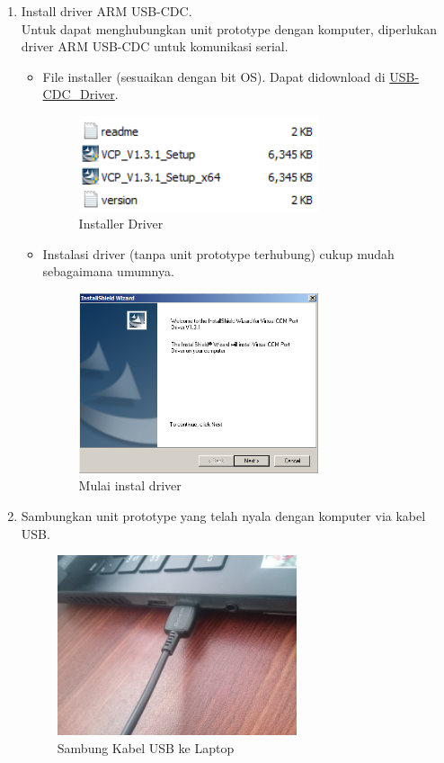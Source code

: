 \documentclass{article}
\begin{document}
	\begin{enumerate}
		\item Install driver ARM USB-CDC.\\
		Untuk dapat menghubungkan unit prototype dengan komputer,
		diperlukan driver ARM USB-CDC untuk komunikasi serial.
		
		\begin{itemize}
			\item File installer (sesuaikan dengan bit OS).
			Dapat didownload di \href{https://drive.google.com/drive/folders/19gXVrxR68SFHQUGGGgKb0Da03oV7Rh41?usp=share_link}{USB-CDC\_Driver}.
			\begin{figure}[!ht]
				\centering
				\includegraphics[width=200pt]{images/software/driver}
				\caption{Installer Driver}
			\end{figure}
			
			\newpage
			\item Instalasi driver (tanpa unit prototype terhubung) cukup mudah sebagaimana umumnya.
			\begin{figure}[!ht]
				\centering
				\includegraphics[width=200pt]{images/software/install_driver}
				\caption{Mulai instal driver}
			\end{figure}
		\end{itemize}
		
		\item Sambungkan unit prototype yang telah nyala dengan komputer via kabel USB.
		\begin{figure}[!ht]
			\centering
			\includegraphics[width=200pt]{images/pasang/laptop_usb}
			\caption{Sambung Kabel USB ke Laptop}
		\end{figure}
		

\end{enumerate}
\end{document}
